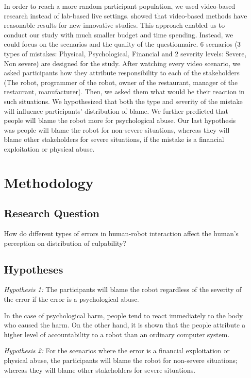 \documentclass{sigchi}
\begin{document}
In order to reach a more random participant population, we used video-based research instead of lab-based live settings. \cite{woods2006comparing} showed that video-based methods have reasonable results for new innovative studies. This approach enabled us to conduct our study with much smaller budget and time spending. Instead, we could focus on the scenarios and the quality of the questionnaire. 6 scenarios (3 types of mistakes: Physical, Psychological, Financial and 2 severity levels: Severe, Non severe) are designed for the study. After watching every video scenario, we asked participants how they attribute responsibility to each of the stakeholders (The robot, programmer of the robot, owner of the restaurant, manager of the restaurant, manufacturer). Then, we asked them what would be their reaction in such situations. We hypothesized that both the type and severity of the mistake will influence participants' distribution of blame. We further predicted that people will blame the robot more for psychological abuse. Our last hypothesis was people will blame the robot for non-severe situations, whereas they will blame other stakeholders for severe situations, if the mistake is a financial exploitation or physical abuse.

\section{Methodology}
\subsection{Research Question}
How do different types of errors in human-robot interaction affect the human’s perception on distribution of culpability?

\subsection{Hypotheses}
\textit{Hypothesis 1:} The participants will blame the robot regardless of the severity of the error if the error is a psychological abuse.

In the case of psychological harm, people tend to react immediately to the body who caused the harm. On the other hand, it is shown that the people attribute a higher level of accountability to a robot than an ordinary computer system.

\textit{Hypothesis 2:} For the scenarios where the error is a financial exploitation or physical abuse, the participants will blame the robot for non-severe situations; whereas they will blame other stakeholders for severe situations.
\end{document}
